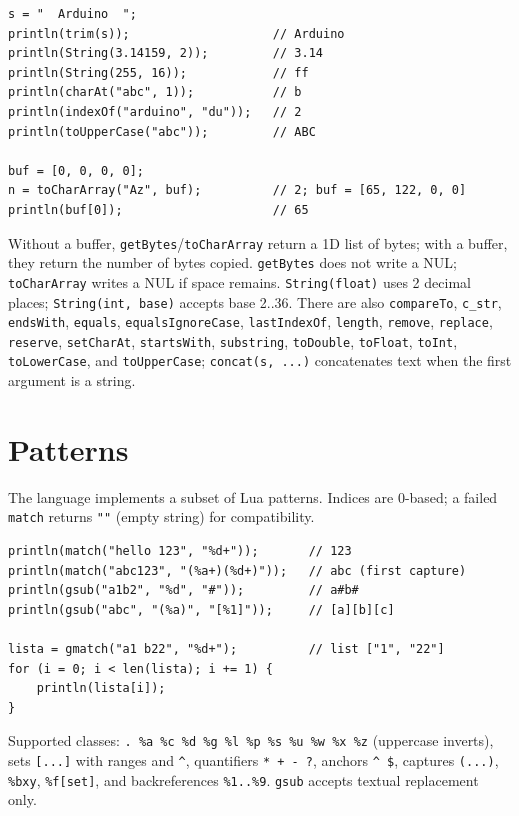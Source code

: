 \documentclass[11pt,a4paper,oneside]{report}
\newcommand{\code}[1]{\texttt{#1}}
\begin{document}
\begin{lstlisting}
s = "  Arduino  ";
println(trim(s));                    // Arduino
println(String(3.14159, 2));         // 3.14
println(String(255, 16));            // ff
println(charAt("abc", 1));           // b
println(indexOf("arduino", "du"));   // 2
println(toUpperCase("abc"));         // ABC

buf = [0, 0, 0, 0];
n = toCharArray("Az", buf);          // 2; buf = [65, 122, 0, 0]
println(buf[0]);                     // 65
\end{lstlisting}

Without a buffer, \code{getBytes}/\code{toCharArray} return a 1D list of
bytes; with a buffer, they return the number of bytes copied.
\code{getBytes} does not write a NUL; \code{toCharArray} writes a NUL if
space remains. \code{String(float)} uses 2 decimal places;
\code{String(int, base)} accepts base 2..36. There are also
\code{compareTo}, \code{c\_str}, \code{endsWith}, \code{equals},
\code{equalsIgnoreCase}, \code{lastIndexOf}, \code{length}, \code{remove},
\code{replace}, \code{reserve}, \code{setCharAt}, \code{startsWith},
\code{substring}, \code{toDouble}, \code{toFloat}, \code{toInt},
\code{toLowerCase}, and \code{toUpperCase}; \code{concat(s, ...)}
concatenates text when the first argument is a string.

\section{Patterns}
The language implements a subset of Lua patterns. Indices are 0-based; a
failed \code{match} returns \code{""} (empty string) for compatibility.

\begin{lstlisting}
println(match("hello 123", "%d+"));       // 123
println(match("abc123", "(%a+)(%d+)"));   // abc (first capture)
println(gsub("a1b2", "%d", "#"));         // a#b#
println(gsub("abc", "(%a)", "[%1]"));     // [a][b][c]

lista = gmatch("a1 b22", "%d+");          // list ["1", "22"]
for (i = 0; i < len(lista); i += 1) {
    println(lista[i]);
}
\end{lstlisting}

Supported classes: \code{. \%a \%c \%d \%g \%l \%p \%s \%u \%w \%x \%z}
(uppercase inverts), sets \code{[...]} with ranges and \code{\^{}},
quantifiers \code{* + - ?}, anchors \code{\^{} \$}, captures
\code{(...)}, \code{\%bxy}, \code{\%f[set]}, and backreferences
\code{\%1..\%9}. \code{gsub} accepts textual replacement only.
\end{document}
